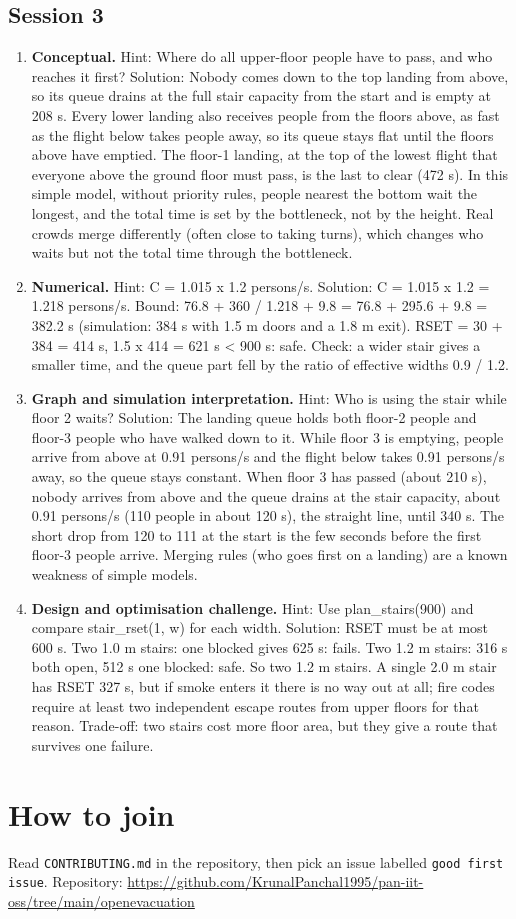 \documentclass[11pt,a4paper]{article}
\begin{document}
\subsection*{Session 3}
\begin{enumerate}[nosep]
\item \textbf{Conceptual.} Hint: Where do all upper-floor people have to pass, and who reaches it first? Solution: Nobody comes down to the top landing from above, so its queue drains at the full stair capacity from the start and is empty at 208 s. Every lower landing also receives people from the floors above, as fast as the flight below takes people away, so its queue stays flat until the floors above have emptied. The floor-1 landing, at the top of the lowest flight that everyone above the ground floor must pass, is the last to clear (472 s). In this simple model, without priority rules, people nearest the bottom wait the longest, and the total time is set by the bottleneck, not by the height. Real crowds merge differently (often close to taking turns), which changes who waits but not the total time through the bottleneck.
\item \textbf{Numerical.} Hint: C = 1.015 x 1.2 persons/s. Solution: C = 1.015 x 1.2 = 1.218 persons/s. Bound: 76.8 + 360 / 1.218 + 9.8 = 76.8 + 295.6 + 9.8 = 382.2 s (simulation: 384 s with 1.5 m doors and a 1.8 m exit). RSET = 30 + 384 = 414 s, 1.5 x 414 = 621 s < 900 s: safe. Check: a wider stair gives a smaller time, and the queue part fell by the ratio of effective widths 0.9 / 1.2.
\item \textbf{Graph and simulation interpretation.} Hint: Who is using the stair while floor 2 waits? Solution: The landing queue holds both floor-2 people and floor-3 people who have walked down to it. While floor 3 is emptying, people arrive from above at 0.91 persons/s and the flight below takes 0.91 persons/s away, so the queue stays constant. When floor 3 has passed (about 210 s), nobody arrives from above and the queue drains at the stair capacity, about 0.91 persons/s (110 people in about 120 s), the straight line, until 340 s. The short drop from 120 to 111 at the start is the few seconds before the first floor-3 people arrive. Merging rules (who goes first on a landing) are a known weakness of simple models.
\item \textbf{Design and optimisation challenge.} Hint: Use plan\_stairs(900) and compare stair\_rset(1, w) for each width. Solution: RSET must be at most 600 s. Two 1.0 m stairs: one blocked gives 625 s: fails. Two 1.2 m stairs: 316 s both open, 512 s one blocked: safe. So two 1.2 m stairs. A single 2.0 m stair has RSET 327 s, but if smoke enters it there is no way out at all; fire codes require at least two independent escape routes from upper floors for that reason. Trade-off: two stairs cost more floor area, but they give a route that survives one failure.
\end{enumerate}

\section{How to join}
Read \texttt{CONTRIBUTING.md} in the repository, then pick an issue labelled \texttt{good first issue}. Repository: \url{https://github.com/KrunalPanchal1995/pan-iit-oss/tree/main/openevacuation}
\end{document}
